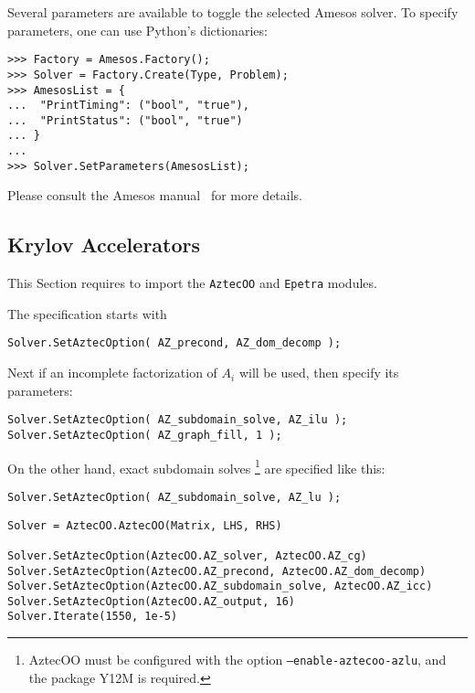 \documentclass[10pt,relax]{SANDreport}
\begin{document}
Several parameters are available to toggle the selected Amesos solver.
To specify parameters, one can use Python's dictionaries:
\begin{verbatim}
>>> Factory = Amesos.Factory();
>>> Solver = Factory.Create(Type, Problem);
>>> AmesosList = {
...  "PrintTiming": ("bool", "true"),
...  "PrintStatus": ("bool", "true")
... }
...
>>> Solver.SetParameters(AmesosList);
\end{verbatim}
Please consult the Amesos manual~\cite{Amesos-Reference-Guide} for more
details.

\subsection{Krylov Accelerators}
\label{sec:iterative}

This Section requires to import the {\tt AztecOO} and {\tt Epetra} modules.

The specification starts with
\begin{verbatim}
Solver.SetAztecOption( AZ_precond, AZ_dom_decomp );
\end{verbatim}
Next if an incomplete factorization of $A_i$ will be used, then specify its parameters:
\begin{verbatim}
Solver.SetAztecOption( AZ_subdomain_solve, AZ_ilu );
Solver.SetAztecOption( AZ_graph_fill, 1 );
\end{verbatim}
On the other hand, exact subdomain solves
\footnote{AztecOO must be
  configured with the option {\tt --enable-aztecoo-azlu}, and the
  package Y12M is required.}
are specified like this:
\begin{verbatim}
Solver.SetAztecOption( AZ_subdomain_solve, AZ_lu );
\end{verbatim}

\begin{verbatim}
Solver = AztecOO.AztecOO(Matrix, LHS, RHS)

Solver.SetAztecOption(AztecOO.AZ_solver, AztecOO.AZ_cg)
Solver.SetAztecOption(AztecOO.AZ_precond, AztecOO.AZ_dom_decomp)
Solver.SetAztecOption(AztecOO.AZ_subdomain_solve, AztecOO.AZ_icc)
Solver.SetAztecOption(AztecOO.AZ_output, 16)
Solver.Iterate(1550, 1e-5)
\end{verbatim}
\end{document}
